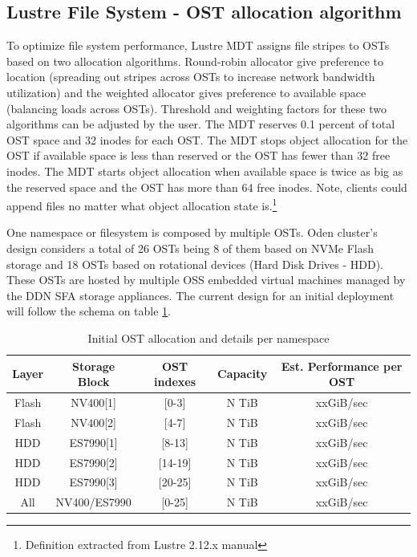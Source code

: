 \documentclass{article}
\begin{document}
\subsection{Lustre File System - OST allocation algorithm}
To optimize file system performance, Lustre MDT assigns file stripes to OSTs based on two allocation algorithms. Round-robin allocator give preference to location (spreading out stripes across OSTs to increase network bandwidth utilization) and the weighted allocator gives preference to available space (balancing loads across OSTs). Threshold and weighting factors for these two algorithms can be adjusted by the user. The MDT reserves 0.1 percent of total OST space and 32 inodes for each OST. The MDT stops object allocation for the OST if available space is less than reserved or the OST has fewer than 32 free inodes. The MDT starts object allocation when available space is twice as big as the reserved space and the OST has more than 64 free inodes. Note, clients could append files no matter what object allocation state is.\footnote{Definition extracted from Lustre 2.12.x manual}

One namespace or filesystem is composed by multiple OSTs. Oden cluster's design considers a total of 26 OSTs being 8 of them based on NVMe Flash storage and 18 OSTs based on rotational devices (Hard Disk Drives - HDD). These OSTs are hosted by multiple OSS embedded virtual machines managed by the DDN SFA storage appliances. 
The current design for an initial deployment will follow the schema on table \ref{tab:ost-allocation}.
\begin{table}[h]
\centering
 \begin{tabular}{||c c c c c||} 
 \hline
 Layer & Storage Block & OST indexes & Capacity & Est. Performance per OST\\ [0.5ex] 
 \hline\hline
 Flash & NV400[1] & [0-3] & N TiB & xxGiB/sec \\ 
 \hline
 Flash & NV400[2] & [4-7] & N TiB & xxGiB/sec \\ 
 \hline
 HDD & ES7990[1] & [8-13] & N TiB & xxGiB/sec \\
 \hline
 HDD & ES7990[2] & [14-19] & N TiB & xxGiB/sec \\
 \hline
 HDD & ES7990[3] & [20-25] & N TiB & xxGiB/sec \\
 \hline
 All & NV400/ES7990 & [0-25] & N TiB & xxGiB/sec \\ [1ex] 
 \hline
\end{tabular}
\caption{Initial OST allocation and details per namespace}
\label{tab:ost-allocation}
\end{table}
\end{document}
